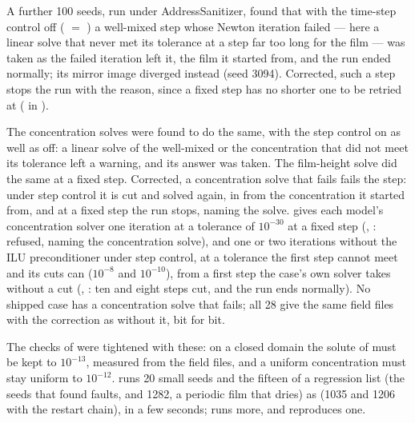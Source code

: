 A further 100 seeds, run under AddressSanitizer, found that with the
time-step control off ( $=$
) a well-mixed step whose Newton
iteration failed --- here a linear solve that never met its tolerance at a
step far too long for the film --- was taken as the failed iteration left
it, the film it started from, and the run ended normally; its mirror image
diverged instead (seed 3094). Corrected, such a step stops the run with the
reason, since a fixed step has no shorter one to be retried at
( in ).

The concentration solves were found to do the same, with the step control
on as well as off: a linear solve of the well-mixed or the 
concentration that did not meet its tolerance left a warning, and its answer
was taken. The  film-height solve did the same at a fixed step.
Corrected, a concentration solve that fails fails the step: under step
control it is cut and solved again, in  from the concentration it
started from, and at a fixed step the run stops, naming the solve.
 gives each model's concentration solver one
iteration at a tolerance of $10^{-30}$ at a fixed step
(, : refused,
naming the concentration solve), and one or two iterations without the ILU
preconditioner under step control, at a tolerance the first step cannot meet
and its cuts can ($10^{-8}$ and $10^{-10}$), from a first step the case's own
solver takes without a cut (, :
ten and eight steps cut, and the run ends normally). No shipped case has a
concentration solve that fails; all 28 give the same field files with the
correction as without it, bit for bit.

The checks of  were tightened with these: on a closed domain
the solute of  must be kept to $10^{-13}$, measured from the field
files, and a uniform  concentration must stay uniform to
$10^{-12}$.
 runs 20 small seeds and the fifteen of a regression list (the seeds that found faults, and 1282, a periodic film that dries) as
 (1035 and 1206 with the restart chain), in a few seconds;  runs more, and
 reproduces one.


